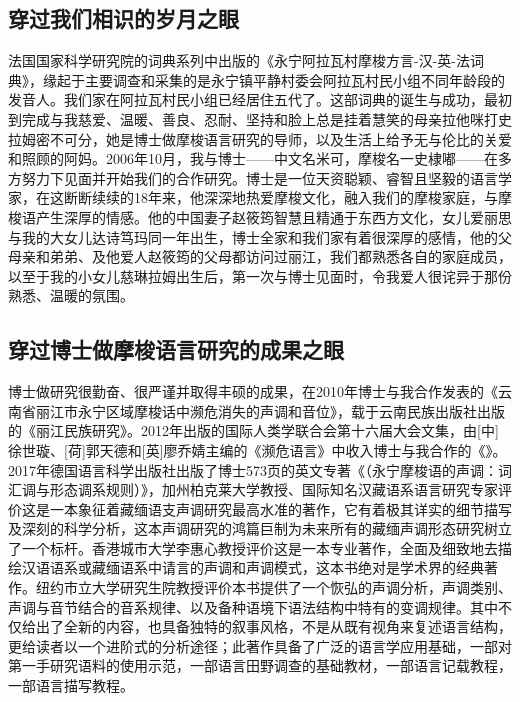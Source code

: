 \subsection*{穿过我们相识的岁月之眼}

法国国家科学研究院的词典系列中出版的《永宁阿拉瓦村摩梭方言-汉-英-法词典》，缘起于主要调查和采集的是永宁镇平静村委会阿拉瓦村民小组不同年龄段的发音人。我们家在阿拉瓦村民小组已经居住五代了。这部词典的诞生与成功，最初到完成与我慈爱、温暖、善良、忍耐、坚持和脸上总是挂着慧笑的母亲拉他咪打史拉姆密不可分，她是博士做摩梭语言研究的导师，以及生活上给予无与伦比的关爱和照顾的阿妈。2006年10月，我与博士——中文名米可，摩梭名一史棣嘟——在多方努力下见面并开始我们的合作研究。博士是一位天资聪颖、睿智且坚毅的语言学家，在这断断续续的18年来，他深深地热爱摩梭文化，融入我们的摩梭家庭，与摩梭语产生深厚的情感。他的中国妻子赵筱筠智慧且精通于东西方文化，女儿爱丽思与我的大女儿达诗笃玛同一年出生，博士全家和我们家有着很深厚的感情，他的父母亲和弟弟、及他爱人赵筱筠的父母都访问过丽江，我们都熟悉各自的家庭成员，以至于我的小女儿慈琳拉姆出生后，第一次与博士见面时，令我爱人很诧异于那份熟悉、温暖的氛围。

\subsection*{穿过博士做摩梭语言研究的成果之眼}

博士做研究很勤奋、很严谨并取得丰硕的成果，在2010年博士与我合作发表的《云南省丽江市永宁区域摩梭话中濒危消失的声调和音位》，载于云南民族出版社出版的《丽江民族研究》。2012年出版的国际人类学联合会第十六届大会文集，由[中]徐世璇、[荷]郭天德和[英]廖乔婧主编的《濒危语言》中收入博士与我合作的《》。2017年德国语言科学出版社出版了博士573页的英文专著《（永宁摩梭语的声调：词汇调与形态调系规则）》，加州柏克莱大学教授、国际知名汉藏语系语言研究专家评价这是一本象征着藏缅语支声调研究最高水准的著作，它有着极其详实的细节描写及深刻的科学分析，这本声调研究的鸿篇巨制为未来所有的藏缅声调形态研究树立了一个标杆。香港城市大学李惠心教授评价这是一本专业著作，全面及细致地去描绘汉语语系或藏缅语系中请言的声调和声调模式，这本书绝对是学术界的经典著作。纽约市立大学研究生院教授评价本书提供了一个恢弘的声调分析，声调类别、声调与音节结合的音系规律、以及备种语境下语法结构中特有的变调规律。其中不仅给出了全新的内容，也具备独特的叙事风格，不是从既有视角来复述语言结构，更给读者以一个进阶式的分析途径；此著作具备了广泛的语言学应用基础，一部对第一手研究语料的使用示范，一部语言田野调查的基础教材，一部语言记载教程，一部语言描写教程。

